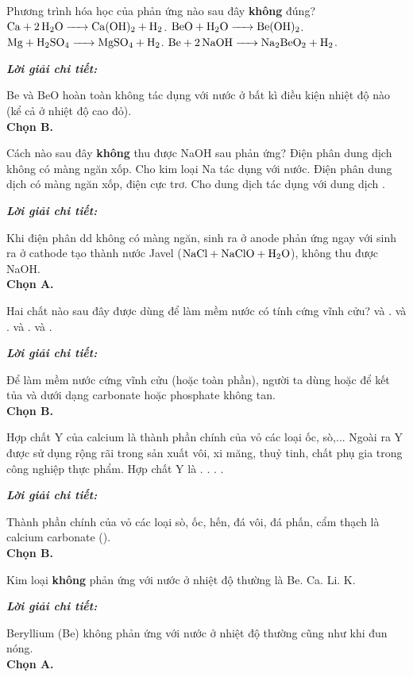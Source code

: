 \documentclass[11pt,a4paper]{article}
\def\loigiai#1{
\par\begingroup\color{blue!80!black}\small
\noindent\textbf{\textit{Lời giải chi tiết:}}\par
#1\par\endgroup}
\begin{document}
\begin{ex}
Phương trình hóa học của phản ứng nào sau đây \textbf{không} đúng?
\choice
{$\ce{Ca + 2H2O -> Ca(OH)2 + H2}$.}
{\True $\ce{BeO + H2O -> Be(OH)2}$.}
{$\ce{Mg + H2SO4 -> MgSO4 + H2}$.}
{$\ce{Be + 2NaOH -> Na2BeO2 + H2}$.}
\loigiai{
Be và BeO hoàn toàn không tác dụng với nước ở bất kì điều kiện nhiệt độ nào (kể cả ở nhiệt độ cao đỏ).\\
\textbf{Chọn B.}}
\end{ex}

\begin{ex}
Cách nào sau đây \textbf{không} thu được NaOH sau phản ứng?
\choice
{\True Điện phân dung dịch  không có màng ngăn xốp.}
{Cho kim loại Na tác dụng với nước.}
{Điện phân dung dịch  có màng ngăn xốp, điện cực trơ.}
{Cho dung dịch  tác dụng với dung dịch .}
\loigiai{
Khi điện phân dd  không có màng ngăn, \ce{Cl2} sinh ra ở anode phản ứng ngay với \ce{NaOH} sinh ra ở cathode tạo thành nước Javel ($\ce{NaCl + NaClO + H2O}$), không thu được NaOH.\\
\textbf{Chọn A.}}
\end{ex}

\begin{ex}
Hai chất nào sau đây được dùng để làm mềm nước có tính cứng vĩnh cửu?
\choice
{ và .}
{\True {} và .}
{ và .}
{ và .}
\loigiai{
Để làm mềm nước cứng vĩnh cửu (hoặc toàn phần), người ta dùng \ce{Na2CO3} hoặc \ce{Na3PO4} để kết tủa \ce{Ca^2+} và \ce{Mg^2+} dưới dạng carbonate hoặc phosphate không tan.\\
\textbf{Chọn B.}}
\end{ex}



\begin{ex}
Hợp chất Y của calcium là thành phần chính của vỏ các loại ốc, sò,... Ngoài ra Y được sử dụng rộng rãi trong sản xuất vôi, xi măng, thuỷ tinh, chất phụ gia trong công nghiệp thực phẩm. Hợp chất Y là
\choice
{.}
{\True {}.}
{.}
{.}
\loigiai{
Thành phần chính của vỏ các loại sò, ốc, hến, đá vôi, đá phấn, cẩm thạch là calcium carbonate (\ce{CaCO3}).\\
\textbf{Chọn B.}}
\end{ex}

\begin{ex}
Kim loại \textbf{không} phản ứng với nước ở nhiệt độ thường là
\choice
{\True Be.}
{Ca.}
{Li.}
{K.}
\loigiai{
Beryllium (Be) không phản ứng với nước ở nhiệt độ thường cũng như khi đun nóng.\\
\textbf{Chọn A.}}
\end{ex}
\end{document}
